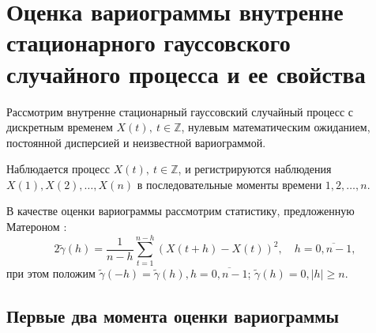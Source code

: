
\newpage

\chapter{Оценка вариограммы внутренне стационарного гауссовского случайного процесса и ее свойства}
\label{c:variogram_estimation}

Рассмотрим внутренне стационарный гауссовский случайный процесс с дискретным временем $ X(t),~ t \in \mathbb{Z} $, нулевым математическим ожиданием, постоянной дисперсией и неизвестной вариограммой.

Наблюдается процесс $ X(t),~ t \in \mathbb{Z} $, и регистрируются наблюдения $ X(1), X(2), \dots, X(n) $ в последовательные моменты времени $ 1, 2, \dots, n $.

В качестве оценки вариограммы рассмотрим статистику, предложенную Матероном \cite{matheron1980}:
\begin{equation}
\label{eq:var_estimation}
	2 \tilde{\gamma}(h) = \frac{1}{n - h} \sum_{t = 1}^{n - h}(X(t + h) - X(t))^2, \quad h = \overline{0, n - 1},
\end{equation}
при этом положим $ \tilde{\gamma}(-h) = \tilde{\gamma}(h), h = \overline{0, n - 1}$; $ \tilde{\gamma}(h) = 0, \vert h \vert \ge n $.

\section{Первые два момента оценки вариограммы} %
\label{sec:variogram_moments}

